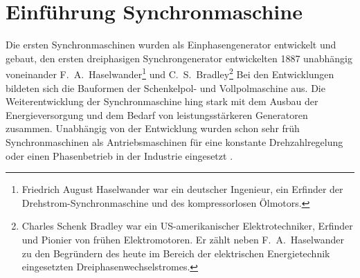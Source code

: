 



\section{Einführung Synchronmaschine}\label{sec:synchron}

Die ersten Synchronmaschinen wurden als Einphasengenerator entwickelt und gebaut, den ersten dreiphasigen Synchrongenerator entwickelten 1887 unabhängig voneinander F.~A.~Haselwander\footnote{Friedrich August Haselwander war ein deutscher Ingenieur, ein Erfinder der Drehstrom-Synchronmaschine und des kompressorlosen Ölmotors.} und C.~S.~Bradley\footnote{Charles Schenk Bradley war ein US-amerikanischer Elektrotechniker, Erfinder und Pionier von frühen Elektromotoren. Er zählt neben F.~A.~Haselwander zu den Begründern des heute im Bereich der elektrischen Energietechnik eingesetzten Dreiphasenwechselstromes.} Bei den Entwicklungen bildeten sich die Bauformen der Schenkelpol- und Vollpolmaschine aus. Die Weiterentwicklung der Synchronmaschine hing stark mit dem Ausbau der Energieversorgung und dem Bedarf von leistungsstärkeren Generatoren zusammen. Unabhängig von der Entwicklung wurden schon sehr früh Synchronmaschinen als Antriebsmaschinen für eine konstante Drehzahlregelung oder einen Phasenbetrieb in der Industrie eingesetzt \autocites[S.~287]{fischer2009}[S.~485f.]{mullerI2005}.


